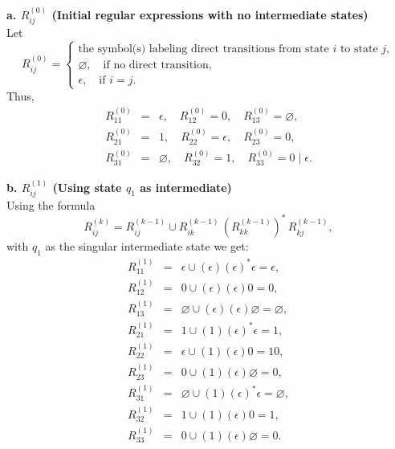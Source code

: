\documentclass{article}
\theoremstyle{theorem}
\theoremstyle{definition}
\theoremstyle{remark}
\begin{document}
\medskip

\textbf{a. \(R_{ij}^{(0)}\) (Initial regular expressions with no intermediate states)}\\[1mm]
Let 
\[
R_{ij}^{(0)} = \begin{cases}
\text{the symbol(s) labeling direct transitions from state } i \text{ to state } j,\\[1mm]
\varnothing, \quad \text{if no direct transition,}\\[1mm]
\epsilon, \quad \text{if } i = j.
\end{cases}
\]
Thus,
\[
\begin{array}{rcl}
R_{11}^{(0)} &=& \epsilon, \quad R_{12}^{(0)} = 0, \quad R_{13}^{(0)} = \varnothing,\\[1mm]
R_{21}^{(0)} &=& 1, \quad R_{22}^{(0)} = \epsilon, \quad R_{23}^{(0)} = 0,\\[1mm]
R_{31}^{(0)} &=& \varnothing, \quad R_{32}^{(0)} = 1, \quad R_{33}^{(0)} = 0 \mid \epsilon.
\end{array}
\]

\medskip

\textbf{b. \(R_{ij}^{(1)}\) (Using state \(q_1\) as intermediate)}\\[1mm]
Using the formula
\[
R_{ij}^{(k)} = R_{ij}^{(k-1)} \cup R_{i k}^{(k-1)}\,(R_{kk}^{(k-1)})^*\, R_{kj}^{(k-1)},
\]
with \(q_1\) as the singular intermediate state we get:
\[
\begin{array}{rcl}
R_{11}^{(1)} &=& \epsilon \cup (\epsilon)(\epsilon)^*\epsilon = \epsilon,\\[1mm]
R_{12}^{(1)} &=& 0 \cup (\epsilon)(\epsilon)0 = 0,\\[1mm]
R_{13}^{(1)} &=& \varnothing \cup (\epsilon)(\epsilon)\varnothing = \varnothing,\\[1mm]
R_{21}^{(1)} &=& 1 \cup (1)(\epsilon)^*\epsilon = 1,\\[1mm]
R_{22}^{(1)} &=& \epsilon \cup (1)(\epsilon)0 = 10,\\[1mm]
R_{23}^{(1)} &=& 0 \cup (1)(\epsilon)\varnothing = 0,\\[1mm]
R_{31}^{(1)} &=& \varnothing \cup (1)(\epsilon)^*\epsilon = \varnothing,\\[1mm]
R_{32}^{(1)} &=& 1 \cup (1)(\epsilon)0 = 1,\\[1mm]
R_{33}^{(1)} &=& 0 \cup (1)(\epsilon)\varnothing = 0.
\end{array}
\]

\medskip
\end{document}

